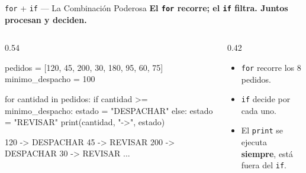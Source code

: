 \documentclass[aspectratio=169, 11pt]{beamer}
\begin{document}
\begin{frame}[fragile,shrink=30]{\texttt{for} + \texttt{if} --- La Combinación Poderosa}
  \vspace{-6pt}
  {\small\color{arcaDark}\bfseries
    El \texttt{for} recorre; el \texttt{if} filtra.
    Juntos procesan \textbf{y} deciden.}

  \vspace{4pt}
  \begin{columns}[T]
    \begin{column}{0.54\textwidth}
      \begin{pyblock}
pedidos = [120, 45, 200, 30, 180, 95, 60, 75]
minimo_despacho = 100

for cantidad in pedidos:
    if cantidad >= minimo_despacho:
        estado = "DESPACHAR"
    else:
        estado = "REVISAR"
    print(cantidad, "->", estado)
      \end{pyblock}
      \vspace{-2pt}
      \begin{outputblock}
120 -> DESPACHAR
45 -> REVISAR
200 -> DESPACHAR
30 -> REVISAR
...
      \end{outputblock}
    \end{column}

    \begin{column}{0.42\textwidth}
      {\footnotesize\color{textMuted}
      \begin{itemize}\setlength{\itemsep}{5pt}
        \item[{\color{arcaRed}\scriptsize\faArrowRight}]
          \texttt{for} recorre los 8 pedidos.
        \item[{\color{arcaRed}\scriptsize\faArrowRight}]
          \texttt{if} decide por cada uno.
        \item[{\color{arcaRed}\scriptsize\faArrowRight}]
          El \texttt{print} se ejecuta
          \textbf{siempre}, está fuera del
          \texttt{if}.
      \end{itemize}
      }
    \end{column}
  \end{columns}
\end{frame}
\end{document}
